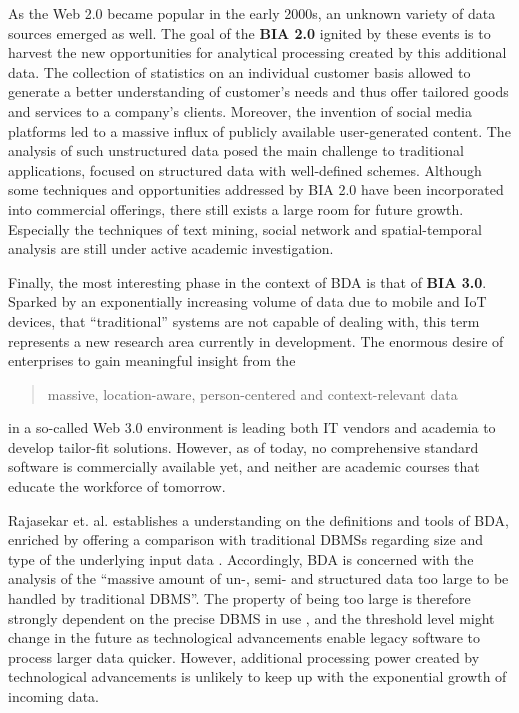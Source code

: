 As the Web 2.0 became popular in the early 2000s, an unknown variety of data sources emerged as well. The goal of the \textbf{\ac{BIA} 2.0} ignited by these events is to harvest the new opportunities for analytical processing created by this additional data. The collection of statistics on an individual customer basis allowed to generate a better understanding of customer's needs and thus offer tailored goods and services to a company's clients.
Moreover, the invention of social media platforms led to a massive influx of publicly available user-generated content. The analysis of such unstructured data posed the main challenge to traditional applications, focused on structured data with well-defined schemes. Although some techniques and opportunities addressed by \ac{BIA} 2.0 have been incorporated into commercial offerings, there still exists a large room for future growth. Especially the techniques of text mining, social network and spatial-temporal analysis are still under active academic investigation. \autocite[Cmp.][p.~1167 \psq]{chen2012business}

Finally, the most interesting phase in the context of \ac{BDA} is that of \textbf{\ac{BIA} 3.0}. Sparked by an exponentially increasing volume of data due to mobile and \ac{IoT} devices, that \enquote{traditional} systems are not capable of dealing with, this term represents a new research area currently in development. The enormous desire of enterprises to gain meaningful insight from the \blockcquote[p.~1168]{chen2012business}{massive, location-aware, person-centered and context-relevant data} in a so-called Web 3.0 environment is leading both IT vendors and academia to develop tailor-fit solutions. However, as of today,  no comprehensive standard software is commercially available yet, and neither are academic courses that educate the workforce of tomorrow. \autocite[Cmp.][p.~1168]{chen2012business}

Rajasekar et. al. establishes a understanding on the definitions and tools of \ac{BDA}, enriched by offering a comparison with traditional \acp{DBMS} regarding size and type of the underlying input data \autocite[Cmp.][p.~80]{rajasekar2015survey}. Accordingly, \ac{BDA} is concerned with the analysis of the \enquote{massive amount of un-, semi- and structured data too large to be handled by traditional DBMS}. The property of being too large is therefore strongly dependent on the precise \ac{DBMS} in use \autocite[Cmp.][p.~80]{rajasekar2015survey}, and the threshold level might change in the future as technological advancements enable legacy software to process larger data quicker. However, additional processing power created by technological advancements is unlikely to keep up with the exponential growth of incoming data. \autocite[Cmp.][p.~80\psq]{rajasekar2015survey}

